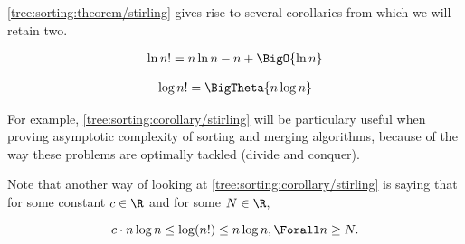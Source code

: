 \ref{tree:sorting:theorem/stirling} gives rise to several corollaries from
which we will retain two.

\begin{corollary}
\begin{align*}
\ln n! &= n \ln n - n + \BigO{\ln n}\\
\end{align*}
\end{corollary}

\begin{corollary}
\label{tree:sorting:corollary/stirling}
\begin{align*}
\log n! &= \BigTheta{n \log n}\\
\end{align*}
\end{corollary}


For example, \ref{tree:sorting:corollary/stirling} will be particulary useful
when proving asymptotic complexity of sorting and merging algorithms, because
of the way these problems are optimally tackled (divide and conquer).

Note that another way of looking at \ref{tree:sorting:corollary/stirling} is
saying that for some constant $c \in \R$ and for some $N \in \R$,

\begin{displaymath}
c \cdot n \log n \leq \log(n!) \leq n \log n, \Forall n \geq N.
\end{displaymath}

